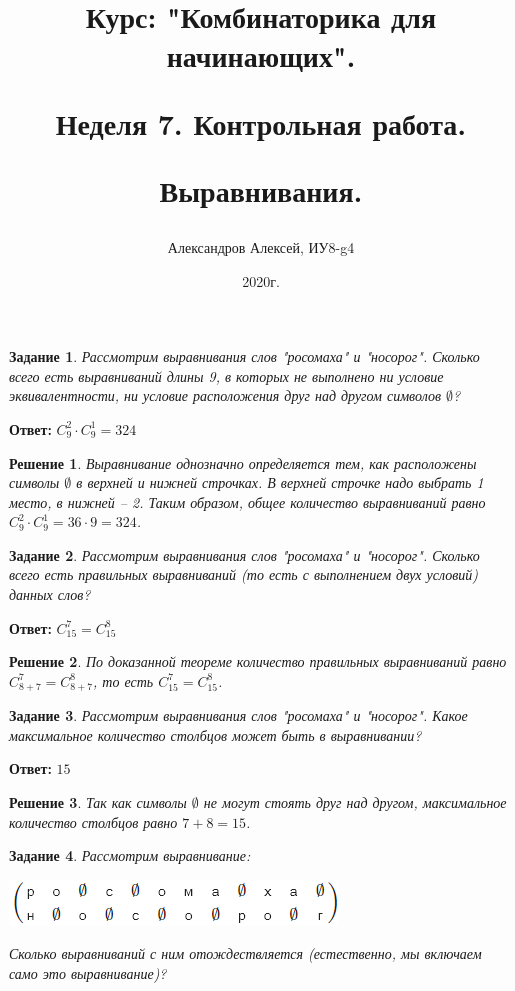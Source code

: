 \documentclass[a4paper,oneside]{memoir}
\title{Курс: "Комбинаторика для начинающих".
	
Неделя 7. Контрольная работа.
	 
Выравнивания.}
\author{Александров Алексей, ИУ8-g4}
\date{2020г.}
\newtheorem{task}{Задание}
\newtheorem{solution}{Решение}
\begin{document}
	
\maketitle

\begin{task}
Рассмотрим выравнивания слов "росомаха" и "носорог". Сколько всего есть выравниваний длины 9, в которых не выполнено ни условие эквивалентности, ни условие расположения друг над другом символов $ \emptyset $?
\end{task}

\textbf{Ответ:} $ C_9^2 \cdot C_9^1 = 324 $

\begin{solution}
	Выравнивание однозначно определяется тем, как расположены символы $ \emptyset $ в верхней и нижней строчках. В верхней строчке надо выбрать 1 место, в нижней -- 2. Таким образом, общее количество выравниваний равно $ C_9^2 \cdot C_9^1 = 36 \cdot 9 = 324 $.
\end{solution}

\hrulefill

\begin{task}
	Рассмотрим выравнивания слов "росомаха" и "носорог". Сколько всего есть правильных выравниваний (то есть с выполнением двух условий) данных слов?
\end{task}

\textbf{Ответ:} $ C_{15}^7 = C_{15}^8 $

\begin{solution}
	По доказанной теореме количество правильных выравниваний равно $ C_{8+7}^7 = C_{8+7}^8 $, то есть $ C_{15}^7 = C_{15}^8 $.
\end{solution}

\hrulefill

\begin{task}
	Рассмотрим выравнивания слов "росомаха" и "носорог". Какое максимальное количество столбцов может быть в выравнивании?
\end{task}

\textbf{Ответ:} $ 15 $

\begin{solution}
	Так как символы $ \emptyset $ не могут стоять друг над другом, максимальное количество столбцов равно $ 7+8=15 $.
\end{solution}

\hrulefill

\begin{task}
	Рассмотрим выравнивание:
	
	\includegraphics{src/task4}
	
	Сколько выравниваний с ним отождествляется (естественно, мы включаем само это выравнивание)?
\end{task}
\end{document}
